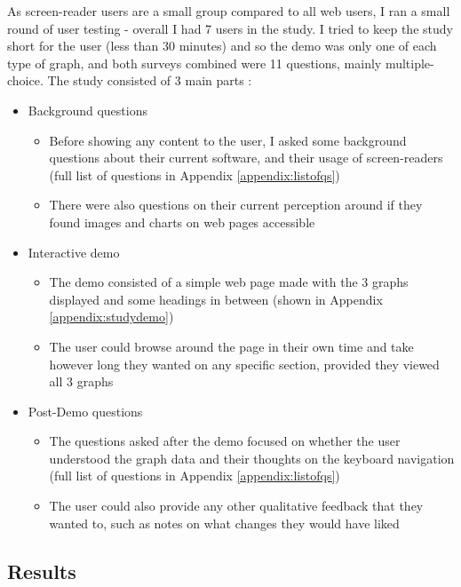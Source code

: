 \documentclass[ %
                    author={Aleena Baig},
                supervisor={Dr Simon Lock},
                    degree={BSc},
                     title={On Making Web Accessible Graphs},
                  subtitle={},
                      year={2019} ]{dissertation}
\begin{document}
As screen-reader users are a small group compared to all web users, I ran a small round of user testing - overall I had 7 users in the study. I tried to keep the study short for the user (less than 30 minutes) and so the demo was only one of each type of graph, and both surveys combined were 11 questions, mainly multiple-choice. The study consisted of 3 main parts : 

\begin{itemize}
    \item Background questions
    \begin{itemize}
        \item Before showing any content to the user, I asked some background questions about their current software, and their usage of screen-readers (full list of questions in Appendix \ref{appendix:listofqs}) 
        \item There were also questions on their current perception around if they found images and charts on web pages accessible
    \end{itemize}
    \item Interactive demo
    \begin{itemize}
        \item The demo consisted of a simple web page made with the 3 graphs displayed and some headings in between (shown in Appendix \ref{appendix:studydemo})
        \item The user could browse around the page in their own time and take however long they wanted on any specific section, provided they viewed all 3 graphs
    \end{itemize}
    \item Post-Demo questions
    \begin{itemize}
        \item The questions asked after the demo focused on whether the user understood the graph data and their thoughts on the keyboard navigation (full list of questions in Appendix \ref{appendix:listofqs}) 
        \item The user could also provide any other qualitative feedback that they wanted to, such as notes on what changes they would have liked
    \end{itemize}
\end{itemize}

\subsection{Results}
\end{document}
